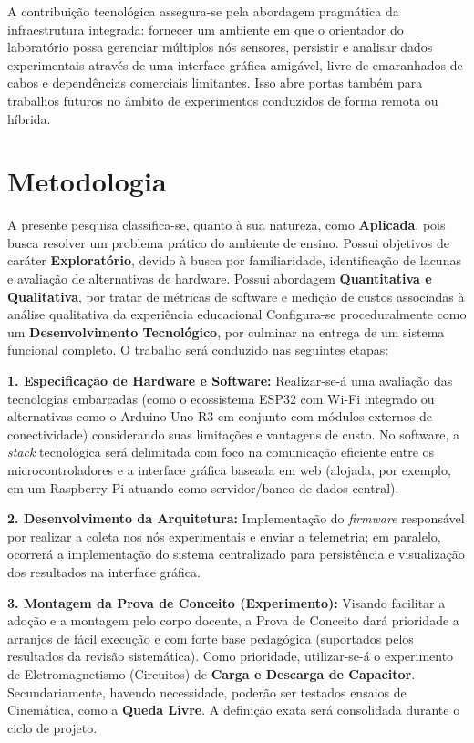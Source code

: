 \documentclass[12pt,a4paper]{article}
\begin{document}
A contribuição tecnológica assegura-se pela abordagem pragmática da infraestrutura integrada: fornecer um ambiente em que o orientador do laboratório possa gerenciar múltiplos nós sensores, persistir e analisar dados experimentais através de uma interface gráfica amigável, livre de emaranhados de cabos e dependências comerciais limitantes. Isso abre portas também para trabalhos futuros no âmbito de experimentos conduzidos de forma remota ou híbrida.

\section{Metodologia}

A presente pesquisa classifica-se, quanto à sua natureza, como \textbf{Aplicada}, pois busca resolver um problema prático do ambiente de ensino. Possui objetivos de caráter \textbf{Exploratório}, devido à busca por familiaridade, identificação de lacunas e avaliação de alternativas de hardware. Possui abordagem \textbf{Quantitativa e Qualitativa}, por tratar de métricas de software e medição de custos associadas à análise qualitativa da experiência educacional Configura-se proceduralmente como um \textbf{Desenvolvimento Tecnológico}, por culminar na entrega de um sistema funcional completo. O trabalho será conduzido nas seguintes etapas:

\textbf{1. Especificação de Hardware e Software:} Realizar-se-á uma avaliação das tecnologias embarcadas (como o ecossistema ESP32 com Wi-Fi integrado ou alternativas como o Arduino Uno R3 em conjunto com módulos externos de conectividade) considerando suas limitações e vantagens de custo. No software, a \textit{stack} tecnológica será delimitada com foco na comunicação eficiente entre os microcontroladores e a interface gráfica baseada em web (alojada, por exemplo, em um Raspberry Pi atuando como servidor/banco de dados central).

\textbf{2. Desenvolvimento da Arquitetura:} Implementação do \textit{firmware} responsável por realizar a coleta nos nós experimentais e enviar a telemetria; em paralelo, ocorrerá a implementação do sistema centralizado para persistência e visualização dos resultados na interface gráfica.

\textbf{3. Montagem da Prova de Conceito (Experimento):} Visando facilitar a adoção e a montagem pelo corpo docente, a Prova de Conceito dará prioridade a arranjos de fácil execução e com forte base pedagógica (suportados pelos resultados da revisão sistemática). Como prioridade, utilizar-se-á o experimento de Eletromagnetismo (Circuitos) de \textbf{Carga e Descarga de Capacitor}. Secundariamente, havendo necessidade, poderão ser testados ensaios de Cinemática, como a \textbf{Queda Livre}. A definição exata será consolidada durante o ciclo de projeto.
\end{document}

